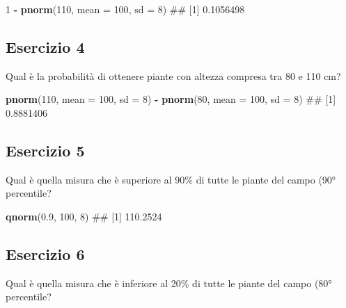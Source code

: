 \documentclass[a4paper,12pt,oneside]{book}
\newenvironment{Shaded}{\begin{snugshade}}{\end{snugshade}}
\newcommand{\KeywordTok}[1]{\textcolor[rgb]{0.13,0.29,0.53}{\textbf{#1}}}
\newcommand{\DataTypeTok}[1]{\textcolor[rgb]{0.13,0.29,0.53}{#1}}
\newcommand{\DecValTok}[1]{\textcolor[rgb]{0.00,0.00,0.81}{#1}}
\newcommand{\FloatTok}[1]{\textcolor[rgb]{0.00,0.00,0.81}{#1}}
\newcommand{\StringTok}[1]{\textcolor[rgb]{0.31,0.60,0.02}{#1}}
\newcommand{\OperatorTok}[1]{\textcolor[rgb]{0.81,0.36,0.00}{\textbf{#1}}}
\newcommand{\NormalTok}[1]{#1}
\theoremstyle{definition}
\theoremstyle{definition}
\theoremstyle{definition}
\theoremstyle{remark}
\begin{document}
\begin{Shaded}
\begin{Highlighting}[]
\DecValTok{1} \OperatorTok{-}\StringTok{ }\KeywordTok{pnorm}\NormalTok{(}\DecValTok{110}\NormalTok{, }\DataTypeTok{mean =} \DecValTok{100}\NormalTok{, }\DataTypeTok{sd =} \DecValTok{8}\NormalTok{)}
\NormalTok{## [1] 0.1056498}
\end{Highlighting}
\end{Shaded}

\subsection{Esercizio 4}\label{esercizio-4}

Qual è la probabilità di ottenere piante con altezza compresa tra 80 e
110 cm?

\begin{Shaded}
\begin{Highlighting}[]
\KeywordTok{pnorm}\NormalTok{(}\DecValTok{110}\NormalTok{, }\DataTypeTok{mean =} \DecValTok{100}\NormalTok{, }\DataTypeTok{sd =} \DecValTok{8}\NormalTok{) }\OperatorTok{-}\StringTok{ }\KeywordTok{pnorm}\NormalTok{(}\DecValTok{80}\NormalTok{, }\DataTypeTok{mean =} \DecValTok{100}\NormalTok{, }\DataTypeTok{sd =} \DecValTok{8}\NormalTok{)}
\NormalTok{## [1] 0.8881406}
\end{Highlighting}
\end{Shaded}

\subsection{Esercizio 5}\label{esercizio-5}

Qual è quella misura che è superiore al 90\% di tutte le piante del
campo (90° percentile?

\begin{Shaded}
\begin{Highlighting}[]
\KeywordTok{qnorm}\NormalTok{(}\FloatTok{0.9}\NormalTok{, }\DecValTok{100}\NormalTok{, }\DecValTok{8}\NormalTok{)}
\NormalTok{## [1] 110.2524}
\end{Highlighting}
\end{Shaded}

\subsection{Esercizio 6}\label{esercizio-6}

Qual è quella misura che è inferiore al 20\% di tutte le piante del
campo (80° percentile?
\end{document}

